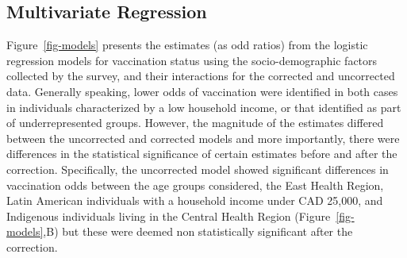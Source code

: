 \documentclass[
]{article}
\begin{document}
\hypertarget{multivariate-regression}{%
\subsection{Multivariate Regression}\label{multivariate-regression}}

Figure~\ref{fig-models} presents the estimates (as odd ratios) from the
logistic regression models for vaccination status using the
socio-demographic factors collected by the survey, and their
interactions for the corrected and uncorrected data. Generally speaking,
lower odds of vaccination were identified in both cases in individuals
characterized by a low household income, or that identified as part of
underrepresented groups. However, the magnitude of the estimates
differed between the uncorrected and corrected models and more
importantly, there were differences in the statistical significance of
certain estimates before and after the correction. Specifically, the
uncorrected model showed significant differences in vaccination odds
between the age groups considered, the East Health Region, Latin
American individuals with a household income under CAD 25,000, and
Indigenous individuals living in the Central Health Region
(Figure~\ref{fig-models},B) but these were deemed non statistically
significant after the correction.
\end{document}
